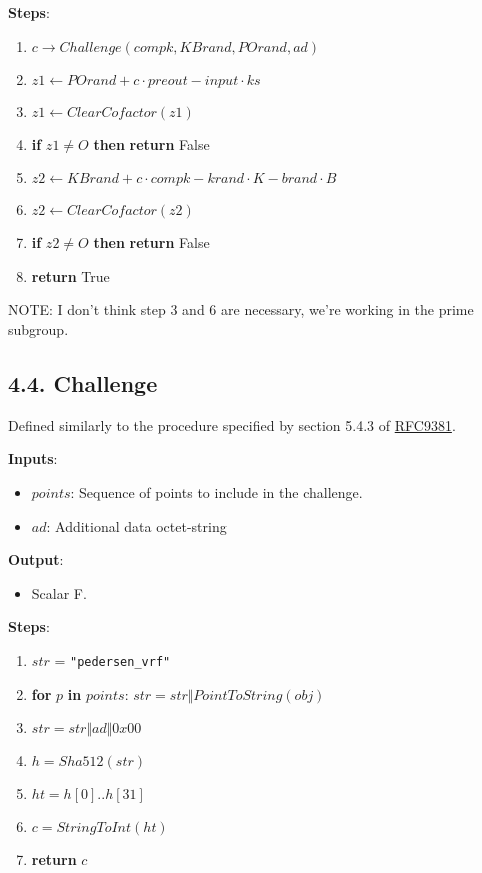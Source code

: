 \documentclass[
]{article}
\providecommand{\tightlist}{%
  \setlength{\itemsep}{0pt}\setlength{\parskip}{0pt}}
\begin{document}
\textbf{Steps}:

\begin{enumerate}
\def\labelenumi{\arabic{enumi}.}
\tightlist
\item
  \(c \rightarrow Challenge(compk, KBrand, POrand, ad)\)
\item
  \(z1 \leftarrow POrand + c \cdot preout - input \cdot ks\)
\item
  \(z1 \leftarrow ClearCofactor(z1)\)
\item
  \textbf{if} \(z1 \neq O\) \textbf{then} \textbf{return} False
\item
  \(z2 \leftarrow KBrand + c \cdot compk - krand \cdot K - brand \cdot B\)
\item
  \(z2 \leftarrow ClearCofactor(z2)\)
\item
  \textbf{if} \(z2 \neq O\) \textbf{then} \textbf{return} False
\item
  \textbf{return} True
\end{enumerate}

NOTE: I don't think step 3 and 6 are necessary, we're working in the
prime subgroup.

\hypertarget{challenge}{%
\subsection{4.4. Challenge}\label{challenge}}

Defined similarly to the procedure specified by section 5.4.3 of
\href{https://datatracker.ietf.org/doc/rfc9381/}{RFC9381}.

\textbf{Inputs}:

\begin{itemize}
\tightlist
\item
  \(points\): Sequence of points to include in the challenge.
\item
  \(ad\): Additional data octet-string
\end{itemize}

\textbf{Output}:

\begin{itemize}
\tightlist
\item
  Scalar \in F.
\end{itemize}

\textbf{Steps}:

\begin{enumerate}
\def\labelenumi{\arabic{enumi}.}
\tightlist
\item
  \(str\) = \texttt{"pedersen\_vrf"}
\item
  \textbf{for} \(p\) \textbf{in} \(points\):
  \(str = str \Vert PointToString(obj)\)
\item
  \(str = str \Vert ad \Vert 0x00\)
\item
  \(h = Sha512(str)\)
\item
  \(ht = h[0] .. h[31]\)
\item
  \(c = StringToInt(ht)\)
\item
  \textbf{return} \(c\)
\end{enumerate}
\end{document}
